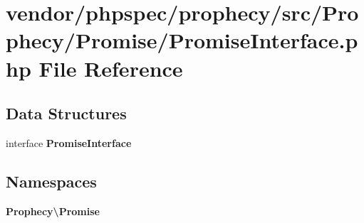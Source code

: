 \section{vendor/phpspec/prophecy/src/\+Prophecy/\+Promise/\+Promise\+Interface.php File Reference}
\label{_promise_interface_8php}
\subsection*{Data Structures}
\begin{DoxyCompactItemize}
\item 
interface {\bf Promise\+Interface}
\end{DoxyCompactItemize}
\subsection*{Namespaces}
\begin{DoxyCompactItemize}
\item 
 {\bf Prophecy\textbackslash{}\+Promise}
\end{DoxyCompactItemize}
